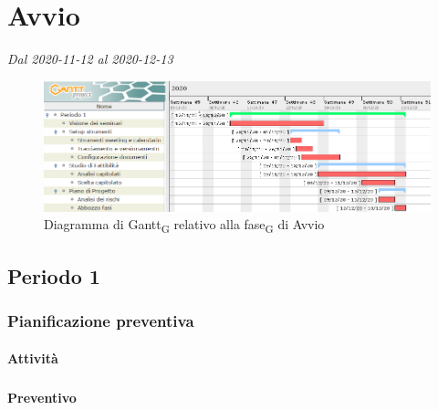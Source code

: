 \section{Avvio}
\textit{Dal 2020-11-12 al 2020-12-13}

\begin{figure}[H]
	\centering
	\includegraphics[scale=0.62]{res/images/gantt_fase/01_gantt_avvio.png}
	\caption{Diagramma di Gantt\textsubscript{G} relativo alla fase\textsubscript{G} di Avvio}
\end{figure}


\subsection{Periodo 1}

\subsubsection{Pianificazione preventiva}



\paragraph{Attività}
\subparagraph*{}

\planningTable{
	
}



\paragraph{Preventivo}
\subparagraph*{}

